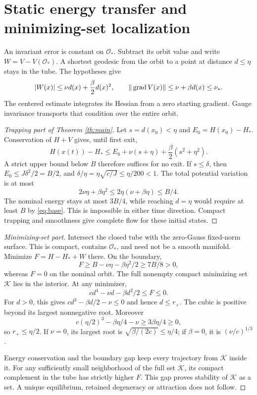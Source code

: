 \documentclass[11pt,a4paper]{article}
\begin{document}
\section{Static energy transfer and minimizing-set localization}
An invariant error is constant on $\mathcal O_*$. Subtract its orbit value and write $W=V-V(\mathcal O_*)$. A shortest geodesic from the orbit to a point at distance $d\le\eta$ stays in the tube. The hypotheses give
\begin{equation}\label{eq:W}
|W(x)|\le\nu d(x)+\frac\beta2d(x)^2,
\qquad\|\operatorname{grad} V(x)\|\le\nu+\beta d(x)\le\nu_*.
\end{equation}
The centered estimate integrates its Hessian from a zero starting gradient. Gauge invariance transports that condition over the entire orbit.

\begin{proof}[Trapping part of Theorem \ref{th:main}]
Let $s=d(x_0)<\eta$ and $E_0=H(x_0)-H_*$. Conservation of $H+V$ gives, until first exit,
\[
H(x(t))-H_*\le E_0+\nu(s+\eta)+\frac\beta2(s^2+\eta^2).
\]
A strict upper bound below $B$ therefore suffices for no exit. If $s\le\delta$, then $E_0\le J\delta^2/2=B/2$, and $\delta/\eta=\eta\sqrt{c/J}\le\eta/200<1$. The total potential variation is at most
\[
2\nu\eta+\beta\eta^2\le2\eta(\nu+\beta\eta)\le B/4.
\]
The nominal energy stays at most $3B/4$, while reaching $d=\eta$ would require at least $B$ by \eqref{eq:base}. This is impossible in either time direction. Compact trapping and smoothness give complete flow for these initial states.
\end{proof}

\begin{proof}[Minimizing-set part]
Intersect the closed tube with the zero-Gauss fixed-norm surface. This is compact, contains $\mathcal O_*$, and need not be a smooth manifold. Minimize $F=H-H_*+W$ there. On the boundary,
\[
F\ge B-\nu\eta-\beta\eta^2/2\ge7B/8>0,
\]
whereas $F=0$ on the nominal orbit. The full nonempty compact minimizing set $\mathcal K$ lies in the interior. At any minimizer,
\[
c d^4-\nu d-\beta d^2/2\le F\le0.
\]
For $d>0$, this gives $c d^3-\beta d/2-\nu\le0$ and hence $d\le r_+$. The cubic is positive beyond its largest nonnegative root. Moreover
\[
c(\eta/2)^3-\beta\eta/4-\nu
\ge 3\beta\eta/4\ge0,
\]
so $r_+\le\eta/2$. If $\nu=0$, its largest root is $\sqrt{\beta/(2c)}\le\eta/4$; if $\beta=0$, it is $(\nu/c)^{1/3}$.

Energy conservation and the boundary gap keep every trajectory from $\mathcal K$ inside it. For any sufficiently small neighborhood of the full set $\mathcal K$, its compact complement in the tube has strictly higher $F$. This gap proves stability of $\mathcal K$ as a set. A unique equilibrium, retained degeneracy or attraction does not follow.
\end{proof}
\newpage
\end{document}
